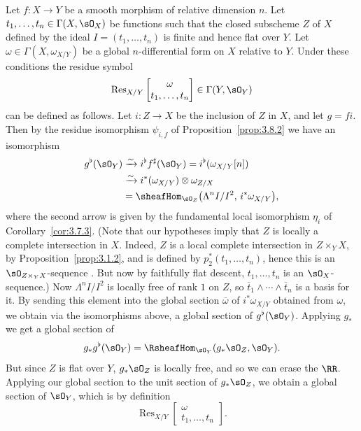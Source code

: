 Let $f\colon X\to Y$ be a smooth morphism of relative dimension $n$. Let $t_1,\dots,t_n\in\Gamma(X,\sO_X)$ be functions such that the closed subscheme $Z$ of $X$ defined by the ideal $I=(t_1,\dots,t_n)$ is finite and hence flat \cite[\nopp IV,~\S11]{EGA} over $Y$. Let $\omega\in\Gamma(X,\omega_{X/Y})$ be a global $n$-differential form on $X$ relative to $Y$. Under these conditions the residue symbol
\[
\operatorname{Res}_{X/Y}\begin{bmatrix} \omega \\ t_1,\dots,t_n \end{bmatrix} \in \Gamma(Y,\sO_Y)
\]
can be defined as follows. Let $i\colon Z\to X$ be the inclusion of $Z$ in $X$, and let $g=fi$. Then by the residue isomorphism $\psi_{i,f}$ of Proposition~\ref{prop:3.8.2} we have an isomorphism
\begin{align*}
g^{\flat}(\sO_Y) &\xrightarrow{\sim} i^{\flat}f^{\sharp}(\sO_Y) = i^{\flat}(\omega_{X/Y}[n]) \\
&\xrightarrow{\sim} i^*(\omega_{X/Y})\otimes\omega_{Z/X} \\
&= \sheafHom_{\sO_Z}\bigl(\Lambda^n I/I^2,\, i^*\omega_{X/Y}\bigr),
\end{align*}
where the second arrow is given by the fundamental local isomorphism $\eta_i$ of Corollary~\ref{cor:3.7.3}. (Note that our hypotheses imply that $Z$ is locally a complete intersection in $X$. Indeed, $Z$ is a local complete intersection in $Z\times_Y X$, by Proposition~\ref{prop:3.1.2}, and is defined by $p_2^*(t_1,\dots,t_n)$, hence this is an $\sO_{Z\times_Y X}$-sequence \cite[\nopp vol.~II, App.~6, Thm.~2]{ZS}. But now by faithfully flat descent, $t_1,\dots,t_n$ is an $\sO_X$-sequence.) Now $\Lambda^n I/I^2$ is locally free of rank $1$ on $Z$, so $\overline{t}_1\wedge\cdots\wedge\overline{t}_n$ is a basis for it. By sending this element into the global section $\overline{\omega}$ of $i^*\omega_{X/Y}$ obtained from $\omega$, we obtain via the isomorphisms above, a global section of $g^{\flat}(\sO_Y)$. Applying $g_*$ we get a global section of
\[
g_*g^{\flat}(\sO_Y) = \RsheafHom_{\sO_Y}(g_*\sO_Z,\sO_Y).
\]
But since $Z$ is flat over $Y$, $g_*\sO_Z$ is locally free, and so we can erase the $\RR$. Applying our global section to the unit section of $g_*\sO_Z$, we obtain a global section of $\sO_Y$, which is by definition
\[
\operatorname{Res}_{X/Y}\begin{bmatrix} \omega \\ t_1,\dots,t_n \end{bmatrix}.
\]

